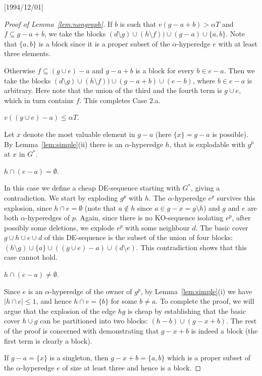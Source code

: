 \NeedsTeXFormat{LaTeX2e}[1994/12/01]\documentclass[letterpaper, 11pt]{article}
\theoremstyle{definition}
\theoremstyle{remark}
\numberwithin{equation}{section}
\begin{document}
\begin{proof}[Proof of Lemma~\ref{lem:nongraph}]
If $b$ is such that $v(g-a+b) > \alpha T$ and $f \subseteq g-a+b$,
we take the blocks 
$(d\setminus g)\cup (h\setminus f))\cup(g-a) \cup\{a,b\}$. 
Note that $\{ a, b\}$ is a block since it is a proper subset of the
$\alpha$-hyperedge $e$ with at least three elements.

Otherwise $f \subseteq (g\cup e)-a$ and $g-a+b$ is a block for every
$b\in e-a$. Then we take the blocks
$(d\setminus g)\cup (h\setminus f))\cup(g-a+b) \cup(e-
b)$, where $b\in e-a$ is arbitrary. Here note that
the union of the third and the fourth term is $g \cup e$, which in
turn contains $f$. This completes Case 2.a.

\medskip

 $v((g\cup e)-a) \leq \alpha T$.

  Let $x$ denote the most valuable element in $g-a$ (here $\{x\}=g-a$ is
  possible). By Lemma~\ref{lem:simple}(ii) there is an
  $\alpha$-hyperedge $h$, that is explodable with $g^p$ at $x$ in $G^*$.

   $h\cap (e-a)= \emptyset$. 

   In this case we define a cheap DE-sequence starting with $G^*$,
giving a contradiction. We start by exploding $g^p$ with
  $h$. The $\alpha$-hyperedge $e^p$ survives this explosion,
  since $h\cap e = \emptyset$ (note that $a\not\in h$ since $a \in
  g -x = g \setminus h$)
  and $g$ and $e$ are both
  $\alpha$-hyperedges of $p$.
  Again, since there is no KO-sequence isolating $e^p$,
  after possibly some deletions, we explode $e^p$ with some
  neighbour $d$. The basic cover $g\cup h \cup e \cup d$
  of this DE-sequence is the subset of the union of four blocks:
  $(h\setminus g)\cup \{ a \} \cup ((g \cup e)-a) \cup (d\setminus
  e)$.
  This contradiction shows that this case cannot hold.

   $h\cap (e-a) \neq \emptyset$.

Since $e$ is an $\alpha$-hyperedge of the owner of $g^p$, by
  Lemma~\ref{lem:simple}(i) we have $|h\cap
  e|\leq 1$, and hence $h\cap e = \{ b \}$ for some $b \neq a$. 
  To complete the proof, we will argue that the explosion of the edge
  $hg$ is cheap by establishing that the basic cover 
$h\cup g$ can be partitioned into two blocks:
$(h- b)\cup (g- x+b)$. 
The rest of the proof is concerned with
demonstrating that $g-x+b$ is indeed a block (the first term is clearly
a block).

If $g-a=\{x\}$ is a singleton, then $g-x+b = \{a, b\}$ which is a
proper subset of the $\alpha$-hyperedge $e$ of size at least three and
hence is a block. 


\end{proof}
\end{document}
